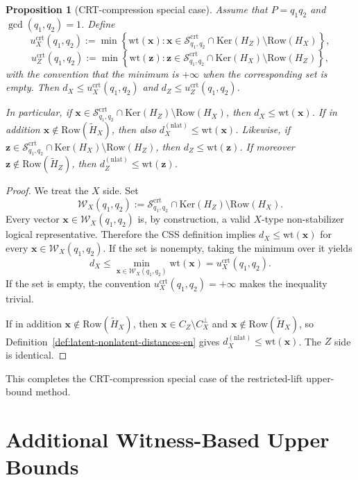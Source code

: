 \documentclass[11pt]{article}
\newcommand{\Ker}{\mathrm{Ker}}
\newcommand{\Row}{\mathrm{Row}}
\newcommand{\wt}{\mathrm{wt}}
\newcommand{\Htil}{\tilde{H}}
\newcommand{\vect}[1]{\bm{#1}}
\newcommand{\vx}{\vect{x}}
\newcommand{\vz}{\vect{z}}
\theoremstyle{uprightthm}
\newtheorem{proposition}[theorem]{Proposition}
\begin{document}
\begin{proposition}[CRT-compression special case]
\label{prop:crt-compression-upper-en}
Assume that $P=q_1q_2$ and $\gcd(q_1,q_2)=1$.
Define
\[
u_X^{\mathrm{crt}}(q_1,q_2)
:=
\min\left\{
\wt(\vx):
\vx \in \mathcal{S}^{\mathrm{crt}}_{q_1,q_2}\cap \Ker(H_Z)\setminus \Row(H_X)
\right\},
\]
\[
u_Z^{\mathrm{crt}}(q_1,q_2)
:=
\min\left\{
\wt(\vz):
\vz \in \mathcal{S}^{\mathrm{crt}}_{q_1,q_2}\cap \Ker(H_X)\setminus \Row(H_Z)
\right\},
\]
with the convention that the minimum is $+\infty$ when the corresponding set is empty.
Then $d_X\le u_X^{\mathrm{crt}}(q_1,q_2)$ and
$d_Z\le u_Z^{\mathrm{crt}}(q_1,q_2)$.

In particular, if
$\vx \in \mathcal{S}^{\mathrm{crt}}_{q_1,q_2}\cap \Ker(H_Z)\setminus \Row(H_X)$,
then $d_X\le \wt(\vx)$. If in addition
$\vx\notin \Row(\Htil_X)$, then also
$d_X^{(\mathrm{nlat})}\le \wt(\vx)$.
Likewise, if
$\vz \in \mathcal{S}^{\mathrm{crt}}_{q_1,q_2}\cap \Ker(H_X)\setminus \Row(H_Z)$,
then $d_Z\le \wt(\vz)$. If moreover
$\vz\notin \Row(\Htil_Z)$, then
$d_Z^{(\mathrm{nlat})}\le \wt(\vz)$.
\end{proposition}

\begin{proof}
We treat the $X$ side. Set
\[
\mathcal{W}_X(q_1,q_2)
:=
\mathcal{S}^{\mathrm{crt}}_{q_1,q_2}\cap \Ker(H_Z)\setminus \Row(H_X).
\]
Every vector $\vx\in\mathcal{W}_X(q_1,q_2)$ is, by construction, a valid
$X$-type non-stabilizer logical representative. Therefore the CSS definition
implies $d_X\le \wt(\vx)$ for every $\vx\in\mathcal{W}_X(q_1,q_2)$.
If the set is nonempty, taking the minimum over it yields
\[
d_X\le \min_{\vx\in\mathcal{W}_X(q_1,q_2)}\wt(\vx)
=u_X^{\mathrm{crt}}(q_1,q_2).
\]
If the set is empty, the convention $u_X^{\mathrm{crt}}(q_1,q_2)=+\infty$
makes the inequality trivial.

If in addition $\vx\notin\Row(\Htil_X)$, then
$\vx\in C_Z\setminus C_X^\perp$ and $\vx\notin \Row(\Htil_X)$,
so Definition~\ref{def:latent-nonlatent-distances-en} gives
$d_X^{(\mathrm{nlat})}\le \wt(\vx)$.
The $Z$ side is identical.
\end{proof}

This completes the CRT-compression special case of the restricted-lift
upper-bound method.

\section{Additional Witness-Based Upper Bounds}
\label{sec:local-decoding-en}
\end{document}
